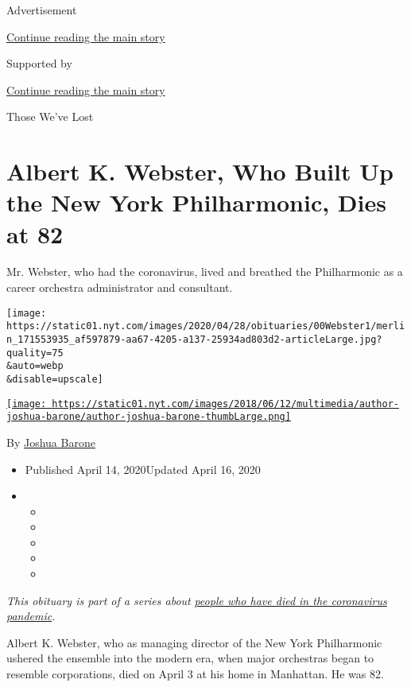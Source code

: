 Advertisement

\protect\hyperlink{after-top}{Continue reading the main story}

Supported by

\protect\hyperlink{after-sponsor}{Continue reading the main story}

Those We've Lost

\hypertarget{albert-k-webster-who-built-up-the-new-york-philharmonic-dies-at-82}{%
\section{Albert K. Webster, Who Built Up the New York Philharmonic, Dies
at
82}\label{albert-k-webster-who-built-up-the-new-york-philharmonic-dies-at-82}}

Mr. Webster, who had the coronavirus, lived and breathed the
Philharmonic as a career orchestra administrator and consultant.

\texttt{[image: https://static01.nyt.com/images/2020/04/28/obituaries/00Webster1/merlin\_171553935\_af597879-aa67-4205-a137-25934ad803d2-articleLarge.jpg?quality=75\\\&auto=webp\\\&disable=upscale]}

\href{https://www.nytimes.com/by/joshua-barone}{\texttt{[image: https://static01.nyt.com/images/2018/06/12/multimedia/author-joshua-barone/author-joshua-barone-thumbLarge.png]}}

By \href{https://www.nytimes.com/by/joshua-barone}{Joshua Barone}

\begin{itemize}
\item
  Published April 14, 2020Updated April 16, 2020
\item
  \begin{itemize}
  \item
  \item
  \item
  \item
  \item
  \end{itemize}
\end{itemize}

\emph{This obituary is part of a series about}
\href{https://www.nytimes.com/series/people-who-have-died-of-the-coronavirus}{\emph{people
who have died in the coronavirus pandemic}}\emph{.}

Albert K. Webster, who as managing director of the New York Philharmonic
ushered the ensemble into the modern era, when major orchestras began to
resemble corporations, died on April 3 at his home in Manhattan. He was
82.


